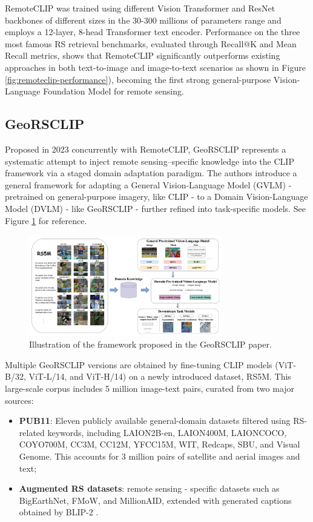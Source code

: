 \documentclass[a4paper, oneside, english]{sapthesis} %
\begin{document}
RemoteCLIP was trained using different Vision Transformer and ResNet backbones of different sizes in the 30-300 millions of parameters range and employs a 12-layer, 8-head Transformer text encoder. Performance on the three most famous RS retrieval benchmarks, evaluated through Recall@K and Mean Recall metrics, shows that RemoteCLIP significantly outperforms existing approaches in both text-to-image and image-to-text scenarios as shown in Figure \ref{fig:remoteclip-performance}), becoming the first strong general-purpose Vision-Language Foundation Model for remote sensing.

\subsection{GeoRSCLIP}

Proposed in 2023 concurrently with RemoteCLIP, GeoRSCLIP \cite{zhang2024rs5m} represents a systematic attempt to inject remote sensing–specific knowledge into the CLIP framework via a staged domain adaptation paradigm. The authors introduce a general framework for adapting a General Vision-Language Model (GVLM) - pretrained on general-purpose imagery, like CLIP - to a Domain Vision-Language Model (DVLM) - like GeoRSCLIP - further refined into task-specific models. See Figure \ref{fig:georsclip-framework} for reference.

\begin{figure}[h]
    \centering
    \includegraphics[width=0.75\textwidth]{img/georsclip-framework.png}
    \caption{Illustration of the framework proposed in the GeoRSCLIP paper.}
    \label{fig:georsclip-framework}
\end{figure}

Multiple GeoRSCLIP versions are obtained by fine-tuning CLIP models (ViT-B/32, ViT-L/14, and ViT-H/14) on a newly introduced dataset, RS5M. This large-scale corpus includes 5 million image-text pairs, curated from two major sources:

\begin{itemize}
    \item \textbf{PUB11}: Eleven publicly available general-domain datasets filtered using RS-related keywords, including LAION2B-en, LAION400M, LAIONCOCO, COYO700M, CC3M, CC12M, YFCC15M, WIT, Redcaps, SBU, and Visual Genome. This accounts for 3 million pairs of satellite and aerial images and text;
    \item \textbf{Augmented RS datasets}: remote sensing - specific datasets such as BigEarthNet, FMoW, and MillionAID, extended with generated captions obtained by BLIP-2 \cite{li2023blip}.
\end{itemize}
\end{document}
